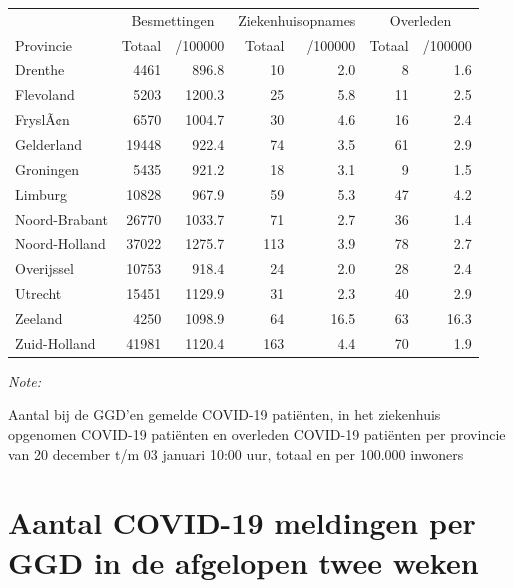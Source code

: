 \documentclass[
  english,
  man,floatsintext]{apa6}
\begin{document}
\begin{table}
\centering
\begin{threeparttable}
\begin{tabular}{lrrrrrr}
\toprule
\multicolumn{1}{c}{ } & \multicolumn{2}{c}{Besmettingen} & \multicolumn{2}{c}{Ziekenhuisopnames} & \multicolumn{2}{c}{Overleden} \\
\cmidrule(l{3pt}r{3pt}){2-3} \cmidrule(l{3pt}r{3pt}){4-5} \cmidrule(l{3pt}r{3pt}){6-7}
Provincie & Totaal & /100000 & Totaal & /100000 & Totaal & /100000\\
\midrule
Drenthe & 4461 & 896.8 & 10 & 2.0 & 8 & 1.6\\
Flevoland & 5203 & 1200.3 & 25 & 5.8 & 11 & 2.5\\
FryslÃ¢n & 6570 & 1004.7 & 30 & 4.6 & 16 & 2.4\\
Gelderland & 19448 & 922.4 & 74 & 3.5 & 61 & 2.9\\
Groningen & 5435 & 921.2 & 18 & 3.1 & 9 & 1.5\\
Limburg & 10828 & 967.9 & 59 & 5.3 & 47 & 4.2\\
Noord-Brabant & 26770 & 1033.7 & 71 & 2.7 & 36 & 1.4\\
Noord-Holland & 37022 & 1275.7 & 113 & 3.9 & 78 & 2.7\\
Overijssel & 10753 & 918.4 & 24 & 2.0 & 28 & 2.4\\
Utrecht & 15451 & 1129.9 & 31 & 2.3 & 40 & 2.9\\
Zeeland & 4250 & 1098.9 & 64 & 16.5 & 63 & 16.3\\
Zuid-Holland & 41981 & 1120.4 & 163 & 4.4 & 70 & 1.9\\
\bottomrule
\end{tabular}
\begin{tablenotes}
\item \textit{Note: } 
\item Aantal bij de GGD’en gemelde COVID-19 patiënten, in het ziekenhuis opgenomen COVID-19 patiënten en overleden COVID-19 patiënten per provincie van 20 december t/m 03 januari 10:00 uur, totaal en per 100.000 inwoners
\end{tablenotes}
\end{threeparttable}
\end{table}

\newpage

\hypertarget{aantal-covid-19-meldingen-per-ggd-in-de-afgelopen-twee-weken}{%
\section{Aantal COVID-19 meldingen per GGD in de afgelopen twee weken}\label{aantal-covid-19-meldingen-per-ggd-in-de-afgelopen-twee-weken}}
\end{document}
